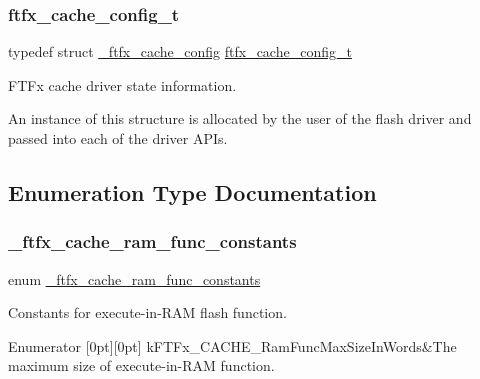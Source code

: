\subsubsection{\texorpdfstring{ftfx\_cache\_config\_t}{ftfx\_cache\_config\_t}}
{\footnotesize\ttfamily typedef struct \mbox{\hyperlink{struct__ftfx__cache__config}{\+\_\+ftfx\+\_\+cache\+\_\+config}}  \mbox{\hyperlink{group__ftfx__cache__driver_ga8ddae8f98cec13ff7c33bc515d01c487}{ftfx\+\_\+cache\+\_\+config\+\_\+t}}}



F\+T\+Fx cache driver state information. 

An instance of this structure is allocated by the user of the flash driver and passed into each of the driver A\+P\+Is. 

\subsection{Enumeration Type Documentation}
\mbox{\label{group__ftfx__cache__driver_ga94656a81b8ad03c18f8b74dc1a4150d1}} 
\subsubsection{\texorpdfstring{\_ftfx\_cache\_ram\_func\_constants}{\_ftfx\_cache\_ram\_func\_constants}}
{\footnotesize\ttfamily enum \mbox{\hyperlink{group__ftfx__cache__driver_ga94656a81b8ad03c18f8b74dc1a4150d1}{\+\_\+ftfx\+\_\+cache\+\_\+ram\+\_\+func\+\_\+constants}}}



Constants for execute-\/in-\/\+R\+AM flash function. 

\begin{DoxyEnumFields}{Enumerator}
[0pt][0pt]{}\mbox{\label{group__ftfx__cache__driver_gga94656a81b8ad03c18f8b74dc1a4150d1a780ff9cafbfa8b208994881cbe18c182}} 
k\+F\+T\+Fx\+\_\+\+C\+A\+C\+H\+E\+\_\+\+Ram\+Func\+Max\+Size\+In\+Words&The maximum size of execute-\/in-\/\+R\+AM function. \\
\hline

\end{DoxyEnumFields}


